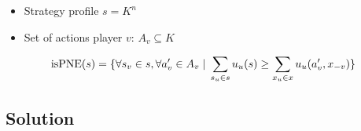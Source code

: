 \documentclass[a4paper, 10pt]{article}
\newcommand{\suchthat}[0]{\hspace{1mm}|\hspace{1mm}}
\begin{document}
\begin{itemize}
    \item Strategy profile $s = K^n$
    \item Set of actions player $v$: $A_v \subseteq K$
\end{itemize}

$$\text{isPNE}(s) = \{\forall s_v \in s, \forall a_v' \in A_v \suchthat \sum_{s_u\in s}u_u(s)\geq \sum_{x_u\in x}u_u(a_v',x_{-v}) \}$$

\subsection*{Solution}


\end{document}
